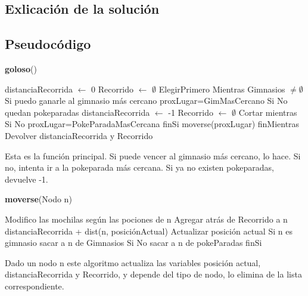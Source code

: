 \documentclass[spanish,12pt]{article}
\begin{document}
\subsection{Exlicación de la solución}



\subsection{Pseudocódigo}

\begin{algorithm}[H]{\textbf{goloso}()}
	\begin{algorithmic}[1]
		\State distanciaRecorrida $\gets$ 0
		\State Recorrido $\gets$ $\emptyset$
		\State ElegirPrimero
		\State Mientras Gimnasios $\not= \emptyset$
		\State \quad Si puedo ganarle al gimnasio más cercano
		\State \qquad proxLugar=GimMasCercano
		\State \quad Si No quedan pokeparadas 
		\State \qquad distanciaRecorrida $\gets$ -1
		\State \qquad Recorrido $\gets$ $\emptyset$
		\State \qquad Cortar mientras
		\State \quad Si No
		\State \qquad proxLugar=PokeParadaMasCercana
		\State \quad finSi
		\State \quad moverse(proxLugar)
		\State finMientras
		\State Devolver distanciaRecorrida y Recorrido 
	\end{algorithmic}
\end{algorithm}

Esta es la función principal. Si puede vencer al gimnasio más cercano, lo hace. Si no, intenta ir a la pokeparada más cercana. Si ya no existen pokeparadas, devuelve -1.

\begin{algorithm}[H]{\textbf{moverse}(Nodo n)}
	\begin{algorithmic}[1]
		\State Modifico las mochilas según las pociones de n
		\State Agregar atrás de Recorrido a n
		\State distanciaRecorrida + dist(n, posiciónActual)
		\State Actualizar posición actual
		\State Si n es gimnasio
		\State \quad sacar a n de Gimnasios
		\State Si No
		\State \quad sacar a n de pokeParadas
		\State finSi
	\end{algorithmic}
\end{algorithm}

Dado un nodo n este algoritmo actualiza las variables posición actual, distanciaRecorrida y Recorrido, y depende del tipo de nodo, lo elimina de la lista correspondiente.
\end{document}
